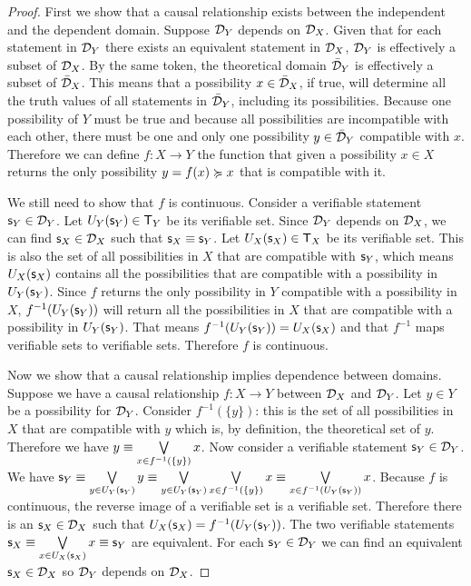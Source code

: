 \documentclass[11pt,letterpaper,fleqn]{memoir} %
\begin{document}
\begin{mathSection}
\begin{thrm}
	\end{thrm}
	\begin{proof}
		First we show that a causal relationship exists between the independent and the dependent domain. Suppose $\mathcal{D}_Y$ depends on $\mathcal{D}_X$. Given that for each statement in $\mathcal{D}_Y$ there exists an equivalent statement in $\mathcal{D}_X$, $\mathcal{D}_Y$ is effectively a subset of $\mathcal{D}_X$. By the same token, the theoretical domain $\bar{\mathcal{D}}_Y$ is effectively a subset of $\bar{\mathcal{D}}_X$. This means that a possibility $x \in \bar{\mathcal{D}}_X$, if true, will determine all the truth values of  all statements in $\bar{\mathcal{D}}_Y$, including its possibilities. Because one possibility of $Y$ must be true and because all possibilities are incompatible with each other, there must be one and only one possibility $y \in \bar{\mathcal{D}}_Y$ compatible with $x$. Therefore we can define $f : X \to Y$ the function that given a possibility $x \in X$ returns the only possibility $y=f(x) \succcurlyeq x$ that is compatible with it.
		
		We still need to show that $f$ is continuous. Consider a verifiable statement $\mathsf{s}_Y \in \mathcal{D}_Y$. Let $U_Y(\mathsf{s}_Y) \in \mathsf{T}_Y$ be its verifiable set. Since $\mathcal{D}_Y$ depends on $\mathcal{D}_X$, we can find $\mathsf{s}_X \in \mathcal{D}_X$ such that $\mathsf{s}_X \equiv \mathsf{s}_Y$. Let $U_X(\mathsf{s}_X) \in \mathsf{T}_X$ be its verifiable set. This is also the set of all possibilities in $X$ that are compatible with $\mathsf{s}_Y$, which means $U_X(\mathsf{s}_X)$ contains all the possibilities that are compatible with a possibility in $U_Y(\mathsf{s}_Y)$. Since $f$ returns the only possibility in $Y$ compatible with a possibility in $X$, $f^{-1}(U_Y(\mathsf{s}_Y))$ will return all the possibilities in $X$ that are compatible with a possibility in $U_Y(\mathsf{s}_Y)$. That means $f^{-1}(U_Y(\mathsf{s}_Y)) = U_X(\mathsf{s}_X)$ and that $f^{-1}$ maps verifiable sets to verifiable sets. Therefore $f$ is continuous.
		
		Now we show that a causal relationship implies dependence between domains. Suppose we have a causal relationship $f: X \to Y$ between $\mathcal{D}_X$ and $\mathcal{D}_Y$. Let $y \in Y$ be a possibility for $\mathcal{D}_Y$. Consider  $f^{-1}(\{y\})$: this is the set of all possibilities in $X$ that are compatible with $y$ which is, by definition, the theoretical set of $y$. Therefore we have $y \equiv \bigvee\limits_{x \in f^{-1}(\{y\})} x$. Now consider a verifiable statement $\mathsf{s}_Y \in \mathcal{D}_Y$. We have $\mathsf{s}_Y \equiv \bigvee\limits_{y \in U_Y(\mathsf{s}_Y)} y \equiv \bigvee\limits_{y \in U_Y(\mathsf{s}_Y)} \bigvee\limits_{x \in f^{-1}(\{y\})} x \equiv \bigvee\limits_{x \in f^{-1}(U_Y(\mathsf{s}_Y))} x$. Because $f$ is continuous, the reverse image of a verifiable set is a verifiable set. Therefore there is an $\mathsf{s}_X \in \mathcal{D}_X$ such that $U_X(\mathsf{s}_X) = f^{-1}(U_Y(\mathsf{s}_Y))$. The two verifiable statements $\mathsf{s}_X \equiv \bigvee\limits_{x \in U_X(\mathsf{s}_X)} x \equiv \mathsf{s}_Y$ are equivalent. For each $\mathsf{s}_Y \in \mathcal{D}_Y$ we can find an equivalent $\mathsf{s}_X \in \mathcal{D}_X$ so $\mathcal{D}_Y$ depends on $\mathcal{D}_X$.
	\end{proof}
\end{mathSection}
\end{document}
